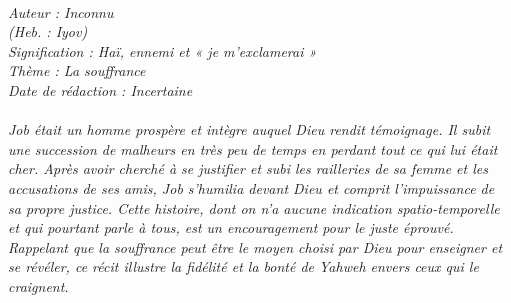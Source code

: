 \BFont
\noindent\hrulefill
{\footnotesize
\textit{
\bigskip
{\centering{}
\\Auteur : Inconnu
\\(Heb. : Iyov)
\\Signification : Haï, ennemi et « je m'exclamerai »
\\Thème : La souffrance
\\Date de rédaction : Incertaine\\}
}
\textit{
\\Job était un homme prospère et intègre auquel Dieu rendit témoignage. Il subit une succession de malheurs en très peu de temps en perdant tout ce qui lui était cher. Après avoir cherché à se justifier et subi les railleries de sa femme et les accusations de ses amis, Job s'humilia devant Dieu et comprit l'impuissance de sa propre justice. Cette histoire, dont on n'a aucune indication spatio-temporelle et qui pourtant parle à tous, est un encouragement pour le juste éprouvé.
\\Rappelant que la souffrance peut être le moyen choisi par Dieu pour enseigner et se révéler, ce récit illustre la fidélité et la bonté de Yahweh envers ceux qui le craignent.\bigskip
}
}
\par\nobreak\noindent\hrulefill
